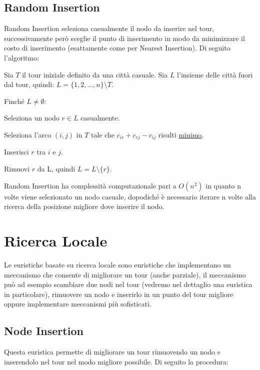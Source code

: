 \documentclass[a4paper,12pt]{report}
\begin{document}
\subsection{Random Insertion}
Random Insertion seleziona casualmente il nodo da inserire nel tour, successivamente però sceglie il punto di inserimento in modo da minimizzare il costo di inserimento (esattamente come per Nearest Insertion). Di seguito l'algoritmo:

\begin{tcolorbox}[colframe=black,colback=white,boxrule=0.5pt, sharp corners]
\begin{legal}
  \item Sia $T$ il tour iniziale definito da una città casuale. Sia $L$ l'insieme delle città fuori dal tour, quindi: $L = \{1, 2, ..., n\} \setminus T$.
  \item Finché $L \neq \emptyset$:
  \begin{legal}
    \item Seleziona un nodo $r \in L$ casualmente.
    \item Seleziona l'arco $(i, j)$ in $T$ tale che $c_{ir} + c_{rj} - c_{ij}$ risulti \underline{minimo}.
    \item Inserisci $r$ tra $i$ e $j$.  
    \item Rimuovi $r$ da L, quindi $L = L \setminus \{r\}$.
  \end{legal}
\end{legal}
\end{tcolorbox}
\hfill \break Random Insertion ha complessità computazionale pari a $O(n^2)$ in quanto n volte viene selezionato un nodo casuale, dopodiché è necessario iterare n volte alla ricerca della posizione migliore dove inserire il nodo.

\section{Ricerca Locale}
Le euristiche basate su ricerca locale\cite{Local Search} sono euristiche che implementano un meccanismo che consente di migliorare un tour (anche parziale), il meccanismo può ad esempio scambiare due nodi nel tour (vedremo nel dettaglio una euristica in particolare), rimuovere un nodo e inserirlo in un punto del tour migliore oppure implementare meccanismi più sofisticati.

\subsection{Node Insertion}
Questa euristica permette di migliorare un tour rimuovendo un nodo e inserendolo nel tour nel modo migliore possibile. Di seguito la procedura:
\end{document}
